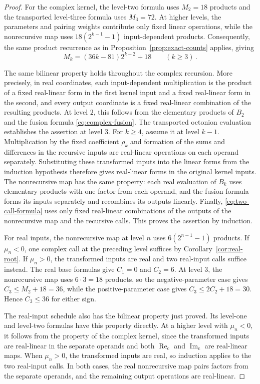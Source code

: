 \documentclass[11pt,reqno]{amsart}
\numberwithin{equation}{section}
\newcommand{\ReC}{\operatorname{Re}_{\mathrm c}}
\newcommand{\ImC}{\operatorname{Im}_{\mathrm c}}
\begin{document}
\begin{proof}
For the complex kernel, the level-two formula uses $M_2=18$ products and
the transported level-three formula uses $M_3=72$. At higher levels, the
parameters and pairing weights contribute only fixed linear operations,
while the nonrecursive map uses $18(2^{k-1}-1)$ input-dependent products.
Consequently, the same product recurrence as in
Proposition~\ref{prop:exact-counts} applies, giving
\[
M_k=(36k-81)2^{k-2}+18\qquad(k\ge3)\,.
\]

The same bilinear property holds throughout the complex recursion. More
precisely, in real coordinates, each input-dependent multiplication is
the product of a fixed real-linear form in the first kernel input and a
fixed real-linear form in the second, and every output coordinate is a
fixed real-linear combination of the resulting products. At level $2$,
this follows from the elementary products of $B_2$ and the fusion formula
\eqref{eq:complex-fusion}. The transported octonion evaluation establishes
the assertion at level $3$. For $k\ge4$, assume it at level $k-1$.
Multiplication by the fixed coefficient $\rho_k$ and formation of the
sums and differences in the recursive inputs are real-linear operations
on each operand separately. Substituting these transformed inputs into
the linear forms from the induction hypothesis therefore gives
real-linear forms in the original kernel inputs. The nonrecursive map has the
same property: each real evaluation of $B_k$ uses elementary products
with one factor from each operand, and the fusion formula forms its
inputs separately and recombines its outputs linearly. Finally,
\eqref{eq:two-call-formula} uses only fixed real-linear combinations of
the outputs of the nonrecursive map and the recursive calls. This proves the
assertion by induction.

For real inputs, the nonrecursive map at level $n$ uses
$6(2^{n-1}-1)$ products. If $\mu_n<0$, one complex call at the preceding
level suffices by Corollary~\ref{cor:real-root}. If $\mu_n>0$, the
transformed inputs are real and two real-input calls suffice instead.
The real base formulas give $C_1=0$ and $C_2=6$. At level $3$, the
nonrecursive map uses $6\cdot3=18$ products, so the negative-parameter
case gives $C_3\le M_2+18=36$, while the positive-parameter case gives
$C_3\le2C_2+18=30$. Hence $C_3\le36$ for either sign.

The real-input schedule also has the bilinear property just proved. Its
level-one and level-two formulas have this property directly. At a
higher level with $\mu_n<0$, it follows from the property of the complex
kernel, since the transformed inputs are real-linear in the separate
operands and both $\ReC$ and $\ImC$ are real-linear maps. When
$\mu_n>0$, the transformed inputs are real, so induction applies to the
two real-input calls. In both cases, the real nonrecursive map pairs factors
from the separate operands, and the remaining output operations are
real-linear.


\end{proof}
\end{document}
